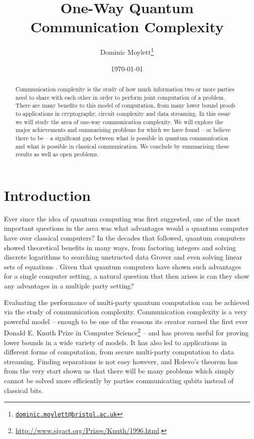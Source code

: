 \documentclass[a4paper]{article}
\begin{document}
    \title{One-Way Quantum Communication Complexity}
    \author{Dominic Moylett\thanks{\texttt{\href{dominic.moylett@bristol.ac.uk}{dominic.moylett@bristol.ac.uk}}}}
    \date{\today}
    \maketitle

    \begin{abstract}
        Communication complexity is the study of how much information two or more parties need to share with each other in order to perform joint computation of a problem. There are many benefits to this model of computation, from many lower bound proofs to applications in cryptography, circuit complexity and data streaming. In this essay we will study the area of one-way communication complexity. We will explore the major achievements and summarising problems for which we have found -- or believe there to be -- a significant gap between what is possible in quantum communication and what is possible in classical communication. We conclude by summarising these results as well as open problems.
    \end{abstract}

    \section{Introduction}

        Ever since the idea of quantum computing was first suggested, one of the most important questions in the area was what advantages would a quantum computer have over classical computers? In the decades that followed, quantum computers showed theoretical benefits in many ways, from factoring integers and solving discrete logarithms \cite{Shor:1997:PAP:264393.264406} to searching unstructed data Grover \cite{Grover:1996:FQM:237814.237866} and even solving linear sets of equations \cite{PhysRevLett.103.150502}. Given that quantum computers have shown such advantages for a single computer setting, a natural question that then arises is can they show any advantages in a multiple party setting?

        Evaluating the performance of multi-party quantum computation can be achieved via the study of communication complexity. Communication complexity is a very powerful model -- enough to be one of the reasons its creator earned the first ever Donald E. Knuth Prize in Computer Science\footnote{\url{http://www.sigact.org/Prizes/Knuth/1996.html}.} -- and has proven useful for proving lower bounds in a wide variety of models. It has also led to applications in different forms of computation, from secure multi-party computation to data streaming. Finding separations is not easy however, and Holevo's theorem has from the very start shown us that there will be many problems which simply cannot be solved more efficiently by parties communicating qubits instead of classical bits.
\end{document}
